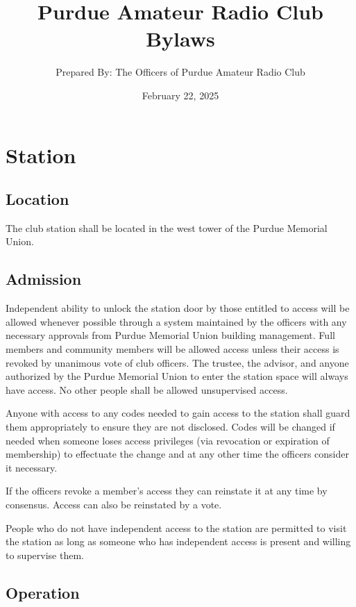 \documentclass{article}
\title{\vspace*{\fill}Purdue Amateur Radio Club Bylaws}
\author{Prepared By: The Officers of Purdue Amateur Radio Club}
\date{February 22, 2025\vspace*{\fill}\vspace*{\fill}}
\begin{document}
\maketitle
\newpage

\tableofcontents
\newpage

\section{Station}

\subsection{Location}

The club station shall be located in the west tower of the Purdue Memorial
Union.

\subsection{Admission}

Independent ability to unlock the station door by those entitled to access will
be allowed whenever possible through a system maintained by the officers with
any necessary approvals from Purdue Memorial Union building management. Full
members and community members will be allowed access unless their access is
revoked by unanimous vote of club officers. The trustee, the advisor, and anyone
authorized by the Purdue Memorial Union to enter the station space will always
have access. No other people shall be allowed unsupervised access.

Anyone with access to any codes needed to gain access to the station shall guard
them appropriately to ensure they are not disclosed. Codes will be changed if
needed when someone loses access privileges (via revocation or expiration of
membership) to effectuate the change and at any other time the officers consider
it necessary.

If the officers revoke a member's access they can reinstate it at any time by
consensus. Access can also be reinstated by a vote.

People who do not have independent access to the station are permitted to visit
the station as long as someone who has independent access is present and willing
to supervise them.

\subsection{Operation}
\end{document}
